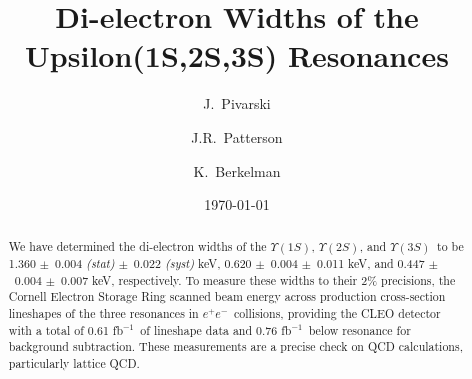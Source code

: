 \documentclass[aps,prl,twocolumn,superscriptaddress,showpacs]{revtex4}
\begin{document}

\title{Di-electron Widths of the Upsilon(1S,2S,3S) Resonances}


\author{J.~Pivarski}
\author{J.R.~Patterson}
\author{K.~Berkelman}

\noaffiliation


\date{\today}

\newcommand{\gee}{$\Gamma_{ee}$}
\newcommand{\ups}{$\Upsilon$}
\newcommand{\us}{$\Upsilon(1S)$}
\newcommand{\uss}{$\Upsilon(2S)$}
\newcommand{\usss}{$\Upsilon(3S)$}
\newcommand{\ee}{$e^+e^-$}
\newcommand{\mm}{$\mu^+\mu^-$}
\newcommand{\tautau}{$\tau^+\tau^-$}
\newcommand{\ellell}{$\ell^+\ell^-$}
\newcommand{\pipi}{$\pi^+\pi^-$}
\newcommand{\PM}{$\pm$}
\newcommand{\inv}{$^{-1}$}
\newcommand{\bmm}{${\mathcal B}_{\mu\mu}$}
\newcommand{\btt}{${\mathcal B}_{\tau\tau}$}
\newcommand{\geehadtot}{\Gamma_{ee}\Gamma_{\mbox{\scriptsize had}}/\Gamma_{\mbox{\scriptsize tot}}}
\newcommand{\pvis}{P_{\mbox{\scriptsize vis}}}
\newcommand{\ppass}{P_{\mbox{\scriptsize pass given vis}}}
\newcommand{\ehtrig}{\epsilon_{\mbox{\scriptsize htrig}}}
\newcommand{\ecuts}{\epsilon_{\mbox{\scriptsize cuts}}}

\begin{abstract} 
We have determined the di-electron widths of the \us, \uss, and \usss\
to be 1.360 \PM\ 0.004 {\it (stat)} \PM\ 0.022 {\it (syst)} keV, 0.620
\PM\ 0.004 \PM\ 0.011 keV, and 0.447 \PM\ 0.004 \PM\ 0.007 keV,
respectively.  To measure these widths to their 2\% precisions, the
Cornell Electron Storage Ring scanned beam energy across production
cross-section lineshapes of the three resonances in \ee\ collisions,
providing the CLEO detector with a total of 0.61 fb\inv\ of lineshape
data and 0.76 fb\inv\ below resonance for background subtraction.
These measurements are a precise check on QCD calculations,
particularly lattice QCD.
\end{abstract}
\end{document}
